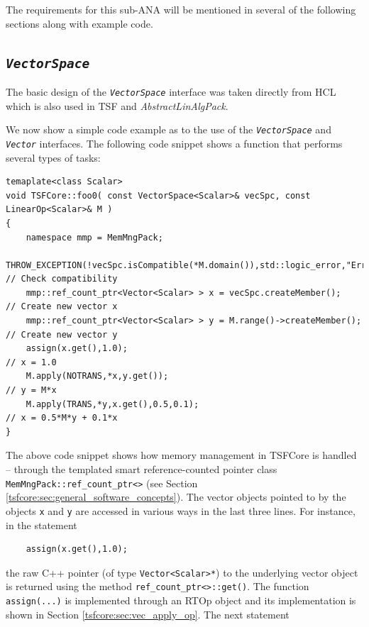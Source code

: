 The requirements for this sub-ANA will be mentioned in several of the
following sections along with example code.

%
\subsection{\texttt{\textit{VectorSpace}}}
\label{tsfcore:sec:vec_space}
%

The basic design of the \texttt{\textit{VectorSpace}} interface was
taken directly from HCL which is also used in TSF and
\textit{AbstractLinAlgPack}.

We now show a simple code example as to the use of the
\texttt{\textit{VectorSpace}} and
\texttt{\textit{Vector}} interfaces.  The following code snippet shows
a function that performs several types of tasks:

{\scriptsize\begin{verbatim}
temaplate<class Scalar>
void TSFCore::foo0( const VectorSpace<Scalar>& vecSpc, const LinearOp<Scalar>& M )
{
    namespace mmp = MemMngPack;
    THROW_EXCEPTION(!vecSpc.isCompatible(*M.domain()),std::logic_error,"Error!"); // Check compatibility
    mmp::ref_count_ptr<Vector<Scalar> > x = vecSpc.createMember();                // Create new vector x
    mmp::ref_count_ptr<Vector<Scalar> > y = M.range()->createMember();            // Create new vector y
    assign(x.get(),1.0);                                                          // x = 1.0
    M.apply(NOTRANS,*x,y.get());                                                  // y = M*x
    M.apply(TRANS,*y,x.get(),0.5,0.1);                                            // x = 0.5*M*y + 0.1*x
}
\end{verbatim}}

\noindent The above code snippet shows how memory management in TSFCore is
handled -- through the templated smart reference-counted pointer class
\texttt{MemMngPack\-::ref\_count\_ptr<>} (see Section
\ref{tsfcore:sec:general_software_concepts}).  The vector objects pointed
to by the objects \texttt{x} and \texttt{y} are accessed in various
ways in the last three lines.  For instance, in the statement

{\scriptsize\begin{verbatim}
    assign(x.get(),1.0);
\end{verbatim}}

\noindent
the raw C++ pointer (of type \texttt{Vector<Scalar>*}) to the
underlying vector object is returned using the method
\texttt{ref\_count\_ptr<>\-::get()}.  The function
\texttt{assign(...)} is implemented through an RTOp object and its
implementation is shown in Section \ref{tsfcore:sec:vec_apply_op}.
The next statement

